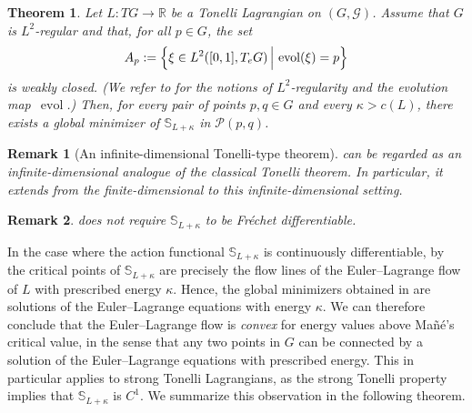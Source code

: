\documentclass[11pt,reqno]{amsart}
\theoremstyle{plain}
\newtheorem{thm}{Theorem}[section]
\newtheorem{rem}[thm]{Remark}
\theoremstyle{definition}
\theoremstyle{plain} %
\newtheorem{rem}[rem]{Remark}
\theoremstyle{definition} %
\numberwithin{equation}{section}
\def\G{\mathcal{G}}
\def\RR{{\mathbb R}}
\begin{document}
\begin{thm}\label{thm:existence of global minimizers}
Let $L : TG \to \RR$ be a Tonelli Lagrangian on $(G,\G)$. 
Assume that \( G \) is \( L^2 \)-regular and that, for all \( p \in G \), the set
\begin{equation*}
    A_{p} := \Bigl\{ \xi \in L^2([0,1], T_e G) \,\Big|\, \operatorname{evol}(\xi) = p \Bigr\}
\end{equation*}
is weakly closed. 
(We refer to  for the notions of $L^2$-regularity and the evolution map~$\operatorname{evol}$.)
Then, for every pair of points \( p, q \in G \) and every \( \kappa > c(L) \), there exists a global minimizer of \( \mathbb{S}_{L + \kappa} \) in \( \mathcal{P}(p, q) \).
\end{thm}
\begin{rem}[An infinite-dimensional Tonelli-type theorem]
     can be regarded as an infinite-dimensional analogue of the classical Tonelli theorem. 
    In particular, it extends \cite[Thm.~3.1.1]{ContrerasIturriaga1999} from the finite-dimensional to this infinite-dimensional setting.
\end{rem}
\begin{rem}
     does not require \( \mathbb{S}_{L+\kappa} \) to be Fréchet differentiable.
\end{rem}

In the case where the action functional \( \mathbb{S}_{L+\kappa} \) is continuously differentiable, by  the critical points of \( \mathbb S_{L + \kappa} \) are precisely the flow lines of the Euler--Lagrange flow of \( L \) with prescribed energy \( \kappa \).
Hence, the global minimizers obtained in  are solutions of the Euler--Lagrange equations with energy \( \kappa \). 
We can therefore conclude that the Euler–Lagrange flow is \emph{convex} for energy values above Mañé’s critical value, in the sense that any two points in \( G \) can be connected by a solution of the Euler–Lagrange equations with prescribed energy. This in particular applies to strong Tonelli Lagrangians, as the strong Tonelli property implies that \( \mathbb S_{L + \kappa} \) is \( C^1 \). We summarize this observation in the following theorem.
\end{document}
